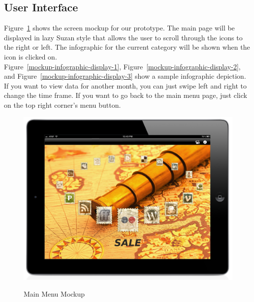 \documentclass[11pt,a4paper,oneside]{article}
\begin{document}
\subsection{User Interface}

Figure~\ref{mockup-main-menu} shows the screen mockup for our prototype.  The main page will be displayed in lazy Suzan style that allows the user to scroll through the icons to the right or left.  The infographic for the current category will be shown when the icon is clicked on.\\


Figure~\ref{mockup-infographic-display-1}, Figure~\ref{mockup-infographic-display-2}, and Figure~\ref{mockup-infographic-display-3} show a sample infographic depiction.  If you want to view data for another month, you can just swipe left and right to change the time frame.  If you want to go back to the main menu page, just click on the top right corner’s menu button.\\


\begin{figure}[!]
\caption{Main Menu Mockup\label{mockup-main-menu}}
\includegraphics[width=1\textwidth]{images/screen.jpg}\\
\end{figure}
\end{document}
